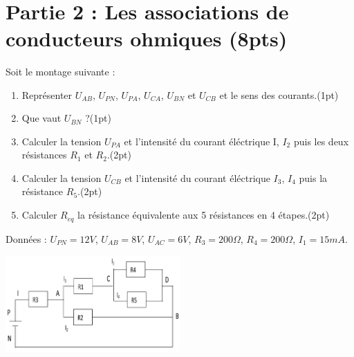 \documentclass[12pt]{article}
\begin{document}

\hrulefill\\
\section*{Partie 2 : Les associations de conducteurs ohmiques \dotfill(8pts)}


Soit le montage suivante :
\begin{enumerate}
    \item Représenter $U_{AB}$, $U_{PN}$, $U_{PA}$, $U_{CA}$,  $U_{BN}$ et $U_{CB}$ et le sens des courants.\dotfill(1pt)
    \item Que vaut $U_{BN}$ ?\dotfill(1pt)
    \item Calculer la tension $U_{PA}$ et l’intensité du courant éléctrique I, $I_2$ puis les deux résistances $R_1$ et $R_2$.\dotfill(2pt)
    \item Calculer la tension $U_{CB}$ et l’intensité du courant éléctrique $I_3$, $I_4$ puis la résistance $R_5$.\dotfill(2pt)
    \item Calculer $R_{eq}$ la résistance équivalente aux 5 résistances en 4 étapes.\dotfill(2pt)
\end{enumerate}
Données : $U_{PN} = 12V$, $U_{AB} = 8V$, $U_{AC} = 6V$, $R_3 = 200\Omega$, $R_4 = 200\Omega$, $I_1 =15 mA.$
\begin{center}
    \includegraphics[width=0.5\textwidth]{./img/resistance.png}
\end{center}
\end{document}

